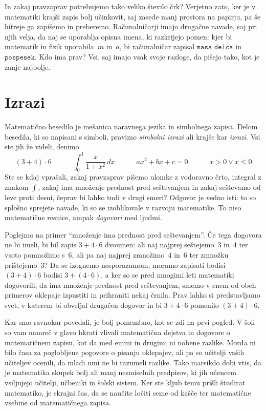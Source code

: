 In zakaj pravzaprav potrebujemo tako veliko število črk? Verjetno zato, ker je v
matematiki krajši zapis bolj učinkovit, saj zasede manj prostora na papirju, pa še hitreje
ga zapišemo in preberemo. Računalničarji imajo drugačne navade, saj pri njih velja, da naj
se uporablja opisna imena, ki razkrijejo pomen: kjer bi matematik in fizik uporabila~$m$
in~$a$, bi računalničar zapisal $\mathtt{masa\_delca}$ in $\texttt{pospesek}$. Kdo ima
prav? Vsi, saj imajo vsak svoje razloge, da pišejo tako, kot je zanje najbolje.

\section{Izrazi}
\label{sec:irazi}

Matematično besedilo je mešanica naravnega jezika in simbolnega zapisa. Delom besedila, ki
so napisani s simboli, pravimo \emph{simbolni izrazi} ali krajše kar \emph{izrazi}. Vsi
ste jih že videli, denimo
%
\begin{equation*}
  (3 + 4) \cdot 6 \qquad\quad
  \int_0^1 \frac{x}{1 + x^2} \, dx \qquad\quad
  a x^2 + b x + c = 0 \qquad\quad
  x > 0 \lor x \leq 0
\end{equation*}
%
Ste se kdaj vprašali, zakaj pravzaprav pišemo ulomke z vodoravno črto, integral z znakom
$\int$, zakaj ima množenje prednost pred seštevanjem in zakaj seštevamo od leve proti
desni, čeprav bi lahko tudi v drugi smeri? Odgovor je vedno isti: to so splošno sprejete
navade, ki so se izoblikovale v razvoju matematike. To niso matematične resnice, ampak
\emph{dogovori} med ljudmi.

Poglejmo na primer ``množenje ima prednost pred seštevanjem''. Če tega dogovora ne bi
imeli, bi bil zapis $3 + 4 \cdot 6$ dvoumen: ali naj najprej seštejemo~$3$ in~$4$ ter
vsoto pomnožimo s~$6$, ali pa naj najprej zmnožimo~$4$ in~$6$ ter zmnožku prištejemo~$3$?
Da se izognemo nesporazumom, moramo zapisati bodisi $(3 + 4) \cdot 6$ bodisi
$3 + (4 \cdot 6)$, a ker so se pred mnogimi leti matematiki dogovorili, da ima množenje
prednost pred seštevanjem, smemo v enem od obeh primerov oklepaje izpustiti in prihraniti
nekaj črnila. Prav lahko si predstavljamo svet, v katerem bi obveljal drugačen dogovor in
bi $3 + 4 \cdot 6$ pomenilo $(3 + 4) \cdot 6$.

%
Kar smo ravnokar povedali, je bolj pomembno, kot se zdi na prvi pogled. V šoli so vam
namreč v glavo hkrati vlivali matematična dejstva in dogovore o matematičnem zapisu, kot
da med enimi in drugimi ni nobene razlike. Morda ni bilo časa za poglobljene pogovore o
pisanju oklepajev, ali pa so učitelji vaših učiteljev ocenili, da mladi umi ne bi razumeli
razlike. Tako marsikdo dobi vtis, da je matematika skupek bolj ali manj nesmiselnih
predpisov, ki jih učencem vsiljujejo učitelji, učbeniki in šolski sistem. Ker ste kljub
temu prišli študirat matematiko, je skrajni čas, da se naučite ločiti seme od kašče ter
matematične vsebine od matematičnega zapisa.


